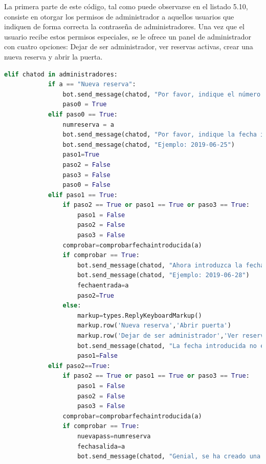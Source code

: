 La primera parte de este código, tal como puede observarse en el listado 5.10, consiste en otorgar los permisos de administrador a aquellos usuarios que indiquen de forma correcta la contraseña de administradores.
Una vez que el usuario recibe estos permisos especiales, se le ofrece un panel de administrador con cuatro opciones: Dejar de ser administrador, ver reservas activas, crear una nueva reserva y abrir la puerta.

\begin{lstlisting}[language=Python,
    caption={Crear nueva reserva},
    label=src:crear-nueva-reserva
]
        elif chatod in administradores:
            if a == "Nueva reserva":
                bot.send_message(chatod, "Por favor, indique el número de la reserva")
                paso0 = True
            elif paso0 == True: 
                numreserva = a
                bot.send_message(chatod, "Por favor, indique la fecha inicial para los clientes:")
                bot.send_message(chatod, "Ejemplo: 2019-06-25")
                paso1=True
                paso2 = False
                paso3 = False
                paso0 = False
            elif paso1 == True:
                if paso2 == True or paso1 == True or paso3 == True:
                    paso1 = False
                    paso2 = False
                    paso3 = False
                comprobar=comprobarfechaintroducida(a)
                if comprobar == True:
                    bot.send_message(chatod, "Ahora introduzca la fecha final:")
                    bot.send_message(chatod, "Ejemplo: 2019-06-28")
                    fechaentrada=a
                    paso2=True
                else:
                    markup=types.ReplyKeyboardMarkup()
                    markup.row('Nueva reserva','Abrir puerta')
                    markup.row('Dejar de ser administrador','Ver reservas activas')
                    bot.send_message(chatod, "La fecha introducida no es correcta, por favor, vuelve a comenzar", None, None, markup)
                    paso1=False
            elif paso2==True:
                if paso2 == True or paso1 == True or paso3 == True:
                    paso1 = False
                    paso2 = False
                    paso3 = False
                comprobar=comprobarfechaintroducida(a)
                if comprobar == True:
                    nuevapass=numreserva
                    fechasalida=a
                    bot.send_message(chatod, "Genial, se ha creado una nueva entrada. Los clientes podrán acceder a la vivienda desde la fecha "+fechaentrada+" hasta la fecha "+fechasalida+". \nPara acceder, sus clientes deberán introducir únicamente su número de reserva")

\end{lstlisting}
